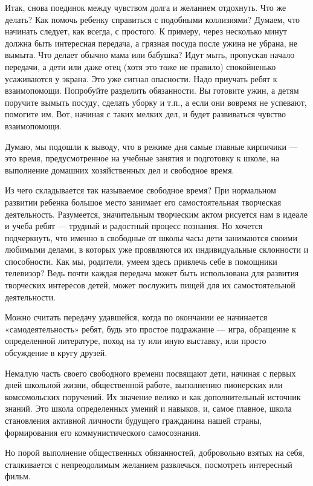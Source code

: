 \documentclass[12pt, a4paper, openany]{book}
\begin{document}
Итак, снова поединок между чувством долга и желанием отдохнуть. Что же делать? Как помочь ребенку справиться с подобными коллизиями? Думаем, что начинать следует, как всегда, с простого. К примеру, через несколько минут должна быть интересная передача, а грязная посуда после ужина не убрана, не вымыта. Что делает обычно мама или бабушка? Идут мыть, пропуская начало передачи, а дети или даже отец (хотя это тоже не правило) спокойненько усаживаются у экрана. Это уже сигнал опасности. Надо приучать ребят к взаимопомощи. Попробуйте разделить обязанности. Вы готовите ужин, а детям поручите вымыть посуду, сделать уборку и т.п., а если они вовремя не успевают, помогите им. Вот, начиная с таких мелких дел, и будет развиваться чувство взаимопомощи. 

Думаю, мы подошли к выводу, что в режиме дня самые главные кирпичики — это время, предусмотренное на учебные занятия и подготовку к школе, на выполнение домашних хозяйственных дел и свободное время. 

Из чего складывается так называемое свободное время? При нормальном развитии ребенка большое место занимает его самостоятельная творческая деятельность. Разумеется, значительным творческим актом рисуется нам в идеале и учеба ребят — трудный и радостный процесс познания. Но хочется подчеркнуть, что именно в свободные от школы часы дети занимаются своими любимыми делами, в которых уже проявляются их индивидуальные склонности и способности. Как мы, родители, умеем здесь привлечь себе в помощники телевизор? Ведь почти каждая передача может быть использована для развития творческих интересов детей, может послужить пищей для их самостоятельной деятельности. 

Можно считать передачу удавшейся, когда по окончании ее начинается «самодеятельность» ребят, будь это простое подражание — игра, обращение к определенной литературе, поход на ту или иную выставку, или просто обсуждение в кругу друзей. 

Немалую часть своего свободного времени посвящают дети, начиная с первых дней школьной жизни, общественной работе, выполнению пионерских или комсомольских поручений. Их значение велико и как дополнительный источник знаний. Это школа определенных умений и навыков, и, самое главное, школа становления активной личности будущего гражданина нашей страны, формирования его коммунистического самосознания. 

Но порой выполнение общественных обязанностей, добровольно взятых на себя, сталкивается с непреодолимым желанием развлечься, посмотреть интересный фильм. 
\end{document}
